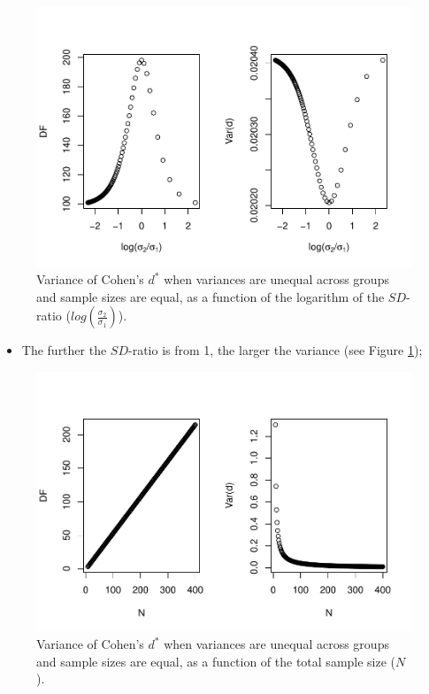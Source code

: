 \documentclass[
  english,
  man,mask]{apa6}
\providecommand{\tightlist}{%
  \setlength{\itemsep}{0pt}\setlength{\parskip}{0pt}}
\begin{document}
\begin{figure}
\centering
\includegraphics{Theoretical-Variance-of-all-estimators-as-a-function-of-population-parameters_files/figure-latex/varcohendprimehetbalSDratio2-1.pdf}
\caption{\label{fig:varcohendprimehetbalSDratio2}Variance of Cohen's \(d^*\) when variances are unequal across groups and sample sizes are equal, as a function of the logarithm of the \(SD\)-ratio (\(log \left( \frac{\sigma_2}{\sigma_1} \right)\)).}
\end{figure}

\begin{itemize}
\tightlist
\item
  The further the \(SD\)-ratio is from 1, the larger the variance (see Figure \ref{fig:varcohendprimehetbalSDratio2});
\end{itemize}

\begin{figure}
\centering
\includegraphics{Theoretical-Variance-of-all-estimators-as-a-function-of-population-parameters_files/figure-latex/varcohendprimehetbalNsize2-1.pdf}
\caption{\label{fig:varcohendprimehetbalNsize2}Variance of Cohen's \(d^*\) when variances are unequal across groups and sample sizes are equal, as a function of the total sample size (\(N\)).}
\end{figure}
\end{document}

